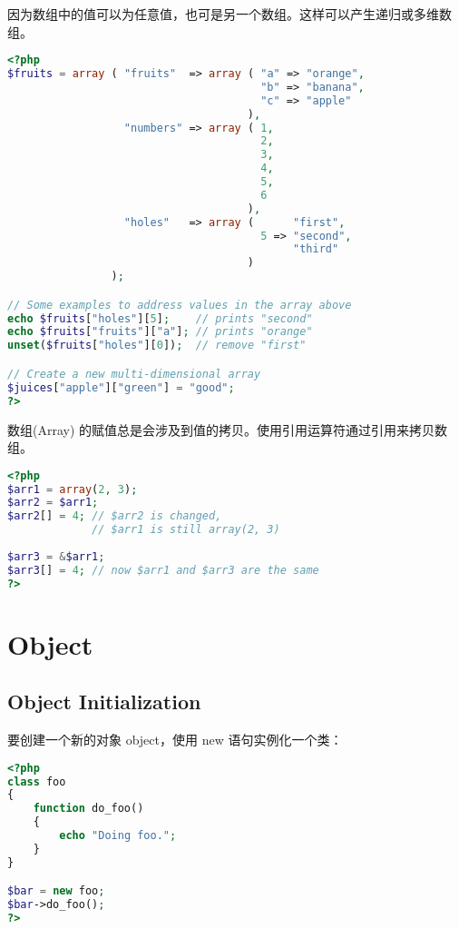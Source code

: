 因为数组中的值可以为任意值，也可是另一个数组。这样可以产生递归或多维数组。



\begin{lstlisting}[language=PHP]
<?php
$fruits = array ( "fruits"  => array ( "a" => "orange",
                                       "b" => "banana",
                                       "c" => "apple"
                                     ),
                  "numbers" => array ( 1,
                                       2,
                                       3,
                                       4,
                                       5,
                                       6
                                     ),
                  "holes"   => array (      "first",
                                       5 => "second",
                                            "third"
                                     )
                );

// Some examples to address values in the array above 
echo $fruits["holes"][5];    // prints "second"
echo $fruits["fruits"]["a"]; // prints "orange"
unset($fruits["holes"][0]);  // remove "first"

// Create a new multi-dimensional array
$juices["apple"]["green"] = "good"; 
?>
\end{lstlisting}


数组(Array) 的赋值总是会涉及到值的拷贝。使用引用运算符通过引用来拷贝数组。


\begin{lstlisting}[language=PHP]
<?php
$arr1 = array(2, 3);
$arr2 = $arr1;
$arr2[] = 4; // $arr2 is changed,
             // $arr1 is still array(2, 3)
             
$arr3 = &$arr1;
$arr3[] = 4; // now $arr1 and $arr3 are the same
?>
\end{lstlisting}






\section{Object}

\subsection{Object Initialization}


要创建一个新的对象 object，使用 new 语句实例化一个类：

\begin{lstlisting}[language=PHP]
<?php
class foo
{
    function do_foo()
    {
        echo "Doing foo."; 
    }
}

$bar = new foo;
$bar->do_foo();
?>
\end{lstlisting}


